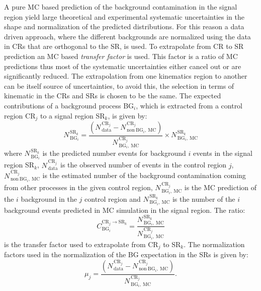 A pure MC based prediction of the background contamination in the signal region
yield large theoretical and experimental systematic uncertainties in the shape
and normalization of the predicted distributions. For this reason a data driven
approach, where the different backgrounds are normalized using the data in CRs
that are orthogonal to the SR, is used. To extrapolate from CR to SR prediction
an MC based \emph{transfer factor} is used. This factor is a ratio of MC
predictions thus most of the systematic uncertainties either cancel out or are
significantly reduced. The extrapolation from one kinematics region to another
can be itself source of uncertainties, to avoid this, the selection in terms of
kinematic in the CRs and SRs is chosen to be the same. The expected
contributions of a background process BG$_i$, which is extracted from a control
region CR$_j$ to a signal region SR$_k$, is
given by:
\begin{equation}
  \label{eq:83}
  N_{\mathrm{\, BG}_i}^{\mathrm{\, SR}_k} = \frac{(N_\mathrm{\,
      data}^{\mathrm{\, CR}_j} - N_{\mathrm{\,
        non~BG}_i,~\mathrm{MC}}^{\mathrm{\, CR}_j})}
  {N^{\mathrm{\, CR}_j}_{\mathrm{\, BG}_i \mathrm{,~MC}}} \times
  N^{\mathrm{\, SR}_k}_{\mathrm{\, BG}_i,~\mathrm{MC}}
\end{equation}
where $N_{\mathrm{\, BG}_i}^{\mathrm{\, SR}_k}$ is the predicted number events
for background $i$ events in the signal region SR$_k$,
$N_\mathrm{\, data}^{\mathrm{\, CR}_j}$ is the observed number of events in the
control region $j$, $N_{\mathrm{\, non~BG}_i,~\mathrm{MC}}^{\mathrm{\, CR}_j}$
is the estimated number of the background contamination coming from other
processes in the given control region,
$N^{\mathrm{\, CR}_j}_{\mathrm{\, BG}_i \mathrm{,~MC}}$ is the MC prediction of
the $i$ background in the $j$ control region and
$N^{\mathrm{\, SR}_k}_{\mathrm{\, BG}_i,~\mathrm{MC}}$ is the number of the $i$
background events predicted in MC simulation in the signal region. The ratio:
\begin{equation}
  \label{eq:84}
  C_{\mathrm{BG}_i}^{\mathrm{CR}_j \rightarrow \mathrm{SR}_k} = \frac{
    N^{\mathrm{\, SR}_k}_{\mathrm{\, BG}_i,~\mathrm{MC}}}{N^{\mathrm{\,
        CR}_j}_{\mathrm{\, BG}_i \mathrm{,~MC}}}
\end{equation}
is the transfer factor used to extrapolate from CR$_j$ to SR$_k$. The
normalization factors used in the normalization of the BG expectation in the SRs
is given by:
\begin{equation}
  \label{eq:85}
  \mu_{j} = \frac{(N_\mathrm{\, data}^{\mathrm{\, CR}_j} - N_{\mathrm{\,
        non~BG}_i,~\mathrm{MC}}^{\mathrm{\, CR}_j})}{N^{\mathrm{\,
        CR}_j}_{\mathrm{\, BG}_i \mathrm{,~MC}}}.
\end{equation}
